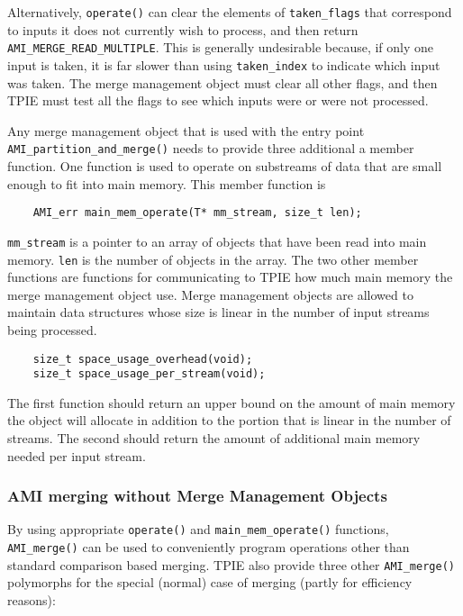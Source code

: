Alternatively, \verb|operate()| can clear the elements of
\verb|taken_flags| that correspond to inputs it does not currently wish to
process, and then return \verb|AMI_MERGE_READ_MULTIPLE|.  This is generally
undesirable because, if only one input is taken, it is far slower than
using \verb|taken_index| to indicate which input was taken.  The merge
management object must clear all other flags, and then TPIE must test all
the flags to see which inputs were or were not processed.

Any merge management object that is used with the entry point
\verb|AMI_partition_and_merge()| needs to provide three additional a member
function. One function is used to operate on substreams of data that are
small enough to fit into main memory. This member function is
\begin{verbatim}
    AMI_err main_mem_operate(T* mm_stream, size_t len);
\end{verbatim}
\verb|mm_stream| is a pointer to an array of objects that have been read
into main memory. \verb|len| is the number of objects in the array. The two
other member functions are functions for communicating to TPIE how much
main memory the merge management object use. Merge management objects are
allowed to maintain data structures whose size is linear in the number of
input streams being processed.
\begin{verbatim}
    size_t space_usage_overhead(void);
    size_t space_usage_per_stream(void);
\end{verbatim}
The first function should return an upper bound on the amount of main
memory the object will allocate in addition to the
portion that is linear in the number of streams. The second should return
the amount of additional main memory needed per input stream.




\subsubsection{AMI merging without Merge Management Objects}
\label{sec:ref-miami-merge}

By using appropriate \verb|operate()| and \verb|main_mem_operate()|
functions, \verb|AMI_merge()| can be used to conveniently program
operations other than standard comparison based merging. TPIE also provide
three other \verb|AMI_merge()| polymorphs for the special (normal) case of
merging (partly for efficiency reasons):

